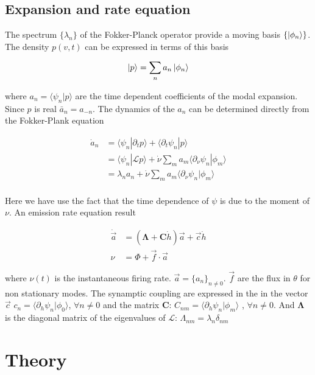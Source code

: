 \documentclass[a4paper,11pt,twoside]{article}
\numberwithin{equation}{section}
\begin{document}
\section{Expansion and rate equation}
The spectrum $\{\lambda_n\}$ of the Fokker-Planck operator provide a moving basis $ \{\ket{\phi_n}\}$. The density $p(v,t)$ can be expressed in terms of this basis

\begin{equation}
\label{eq:p}
\ket{p}=\sum_na_n\ket{\phi_n}
\end{equation}

where $a_n=\langle \psi_n | p\rangle$ are the time dependent coefficients of the modal expansion. Since $p$ is real $\bar{a}_n=a_{-n}$. The dynamics of the $a_n$ can be determined directly from the Fokker-Plank equation

\begin{align}
\dot{a}_n&=\langle\psi_n|\partial_t p\rangle+\langle\partial_t\psi_n|p\rangle \nonumber \\
&=\langle\psi_n|\mathcal{L}p\rangle+  \dot{\nu}\sum_ma_m\langle\partial_\nu\psi_n|\phi_m \rangle \nonumber \\
&=\lambda_n a_n +  \dot{\nu}\sum_ma_m\langle\partial_\nu\psi_n|\phi_m \rangle \nonumber \\
\end{align}

Here we have use the fact that the time dependence of $\psi$ is due to the moment of $\nu$. An emission rate equation result

\begin{align}
\dot{\vec{a}}&=(\boldsymbol{\Lambda}+\boldsymbol{C}\dot{h})\vec{a}+\vec{c}\dot{h}\nonumber\\
\nu&=\Phi+\vec{f}\cdot\vec{a}
\end{align}

where $\nu(t)$ is the instantaneous firing rate. $\vec{a}=\{a_n\}_{n \neq 0}$. $\vec{f}$ are the flux in $\theta$ for non stationary modes. The synamptic coupling are expressed in the in the vector $\vec{c}$ $c_n=\langle\partial_h\psi_n|\phi_0\rangle$, $\forall n \neq 0$ and the matrix $\boldsymbol{C}$: $C_{nm}=\langle\partial_h\psi_n|\phi_m\rangle$ , $\forall n \neq 0$. And $\boldsymbol{\Lambda}$ is the diagonal matrix of the eigenvalues of $\mathcal{L}$: $\Lambda_{nm}=\lambda_n\delta_{nm}$


\FloatBarrier


\chapter{Theory}
\label{sec:theory}
\end{document}
